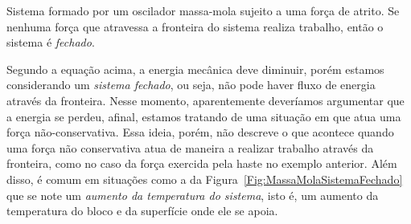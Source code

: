 \begin{marginfigure}
\centering
{}
\caption{Sistema formado por um oscilador massa-mola sujeito a uma força de atrito. Se nenhuma força que atravessa a fronteira do sistema realiza trabalho, então o sistema é \emph{fechado}.\label{Fig:MassaMolaSistemaFechado}}
\end{marginfigure}

Segundo a equação acima, a energia mecânica deve diminuir, porém estamos considerando um \emph{sistema fechado}, ou seja, não pode haver fluxo de energia através da fronteira. Nesse momento, aparentemente deveríamos argumentar que a energia se perdeu, afinal, estamos tratando de uma situação em que atua uma força não-conservativa. Essa ideia, porém, não descreve o que acontece quando uma força não conservativa atua de maneira a realizar trabalho através da fronteira, como no caso da força exercida pela haste no exemplo anterior. Além disso, é comum em situações como a da Figura~\ref{Fig:MassaMolaSistemaFechado} que se note um \emph{aumento da temperatura do sistema}, isto é, um aumento da temperatura do bloco e da superfície onde ele se apoia.

